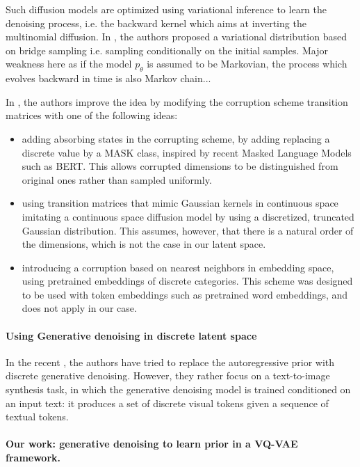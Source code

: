 \documentclass{article}
\begin{document}
 Such diffusion models are optimized using variational inference to learn the denoising process, i.e. the backward kernel which aims at inverting the multinomial diffusion. In \cite{hoogeboom2021argmax}, the authors proposed a variational distribution based on bridge sampling i.e. sampling conditionally on the initial samples. Major weakness here as if the model $p_{\theta}$ is assumed to be Markovian, the process which evolves backward in time  is also Markov chain...

In \cite{austin2021structured}, the authors improve the idea by modifying the corruption scheme transition matrices with one of the following ideas:
\begin{itemize}
	\item adding absorbing states in the corrupting scheme, by adding replacing a discrete value by a MASK class, inspired by recent Masked Language Models such as BERT. This allows corrupted dimensions to be distinguished from original ones rather than sampled uniformly.
	\item using transition matrices that mimic Gaussian kernels in continuous space imitating a continuous space diffusion model by using a discretized, truncated Gaussian distribution. This assumes, however, that there is a natural order of the dimensions, which is not the case in our latent space.
	\item introducing a corruption based on nearest neighbors in embedding space, using pretrained embeddings of discrete categories. This scheme was designed to be used with token embeddings such as pretrained word embeddings, and does not apply in our case.
\end{itemize}

\paragraph{Using Generative denoising in discrete latent space}

In the recent \cite{gu2021vector}, the authors have tried to replace the autoregressive prior with discrete generative denoising. However, they rather focus on a text-to-image synthesis task, in which the generative denoising model is trained conditioned on an input text: it produces a set of discrete visual tokens given a sequence of textual tokens.

\paragraph{Our work: generative denoising to learn prior in a VQ-VAE framework.}
\end{document}
